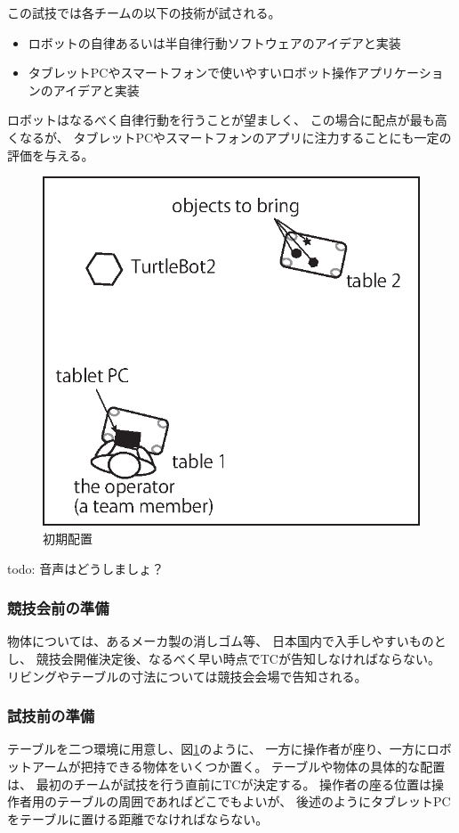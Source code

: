 \documentclass[a4j]{jarticle}
\begin{document}
この試技では各チームの以下の技術が試される。
\begin{itemize}
	\item ロボットの自律あるいは半自律行動ソフトウェアのアイデアと実装
	\item タブレットPCやスマートフォンで使いやすいロボット操作アプリケーションのアイデアと実装
\end{itemize}
ロボットはなるべく自律行動を行うことが望ましく、
この場合に配点が最も高くなるが、
タブレットPCやスマートフォンのアプリに注力することにも一定の評価を与える。


\begin{figure}[h]
	\begin{center}
		\includegraphics[width=0.4\linewidth]{./IMAGE/test1.eps}
		\caption{初期配置}
		\label{fig:test1}
	\end{center}
\end{figure}

todo: 音声はどうしましょ？

\subsubsection{競技会前の準備}

物体については、あるメーカ製の消しゴム等、
日本国内で入手しやすいものとし、
競技会開催決定後、なるべく早い時点でTCが告知しなければならない。
リビングやテーブルの寸法については競技会会場で告知される。

\subsubsection{試技前の準備}

テーブルを二つ環境に用意し、図\ref{fig:test1}のように、
一方に操作者が座り、一方にロボットアームが把持できる物体をいくつか置く。
テーブルや物体の具体的な配置は、
最初のチームが試技を行う直前にTCが決定する。
操作者の座る位置は操作者用のテーブルの周囲であればどこでもよいが、
後述のようにタブレットPCをテーブルに置ける距離でなければならない。
\end{document}

